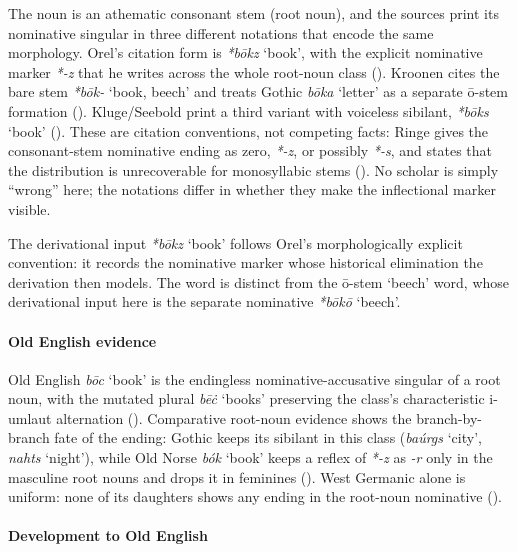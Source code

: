 \documentclass[
  british,
  a4paper,
]{article}
\newcounter{none} %
\providecommand{\Recon}[1]{\emph{*#1}}
\begin{document}
The noun is an athematic consonant stem (root noun), and the sources
print its nominative singular in three different notations that encode
the same morphology. Orel's citation form is \emph{*bōkz} `book', with
the explicit nominative marker \emph{*-z} that he writes across the
whole root-noun class (). Kroonen
cites the bare stem {\emph{*bōk-}} `book, beech' and treats Gothic
\emph{bōka} `letter' as a separate ō-stem formation
(). Kluge/Seebold print
a third variant with voiceless sibilant, {\emph{*bōks}} `book'
(). These are citation
conventions, not competing facts: Ringe gives the consonant-stem
nominative ending as zero, \emph{*-z}, or possibly \emph{*-s}, and
states that the distribution is unrecoverable for monosyllabic stems
(). No scholar is simply
``wrong'' here; the notations differ in whether they make the
inflectional marker visible.

The derivational input \Recon{bōkz} `book' follows Orel's
morphologically explicit convention: it records the nominative marker
whose historical elimination the derivation then models. The word is
distinct from the ō-stem `beech' word, whose derivational input here is
the separate nominative \Recon{bōkō} `beech'.

\paragraph{Old English evidence}\label{old-english-evidence-8}

Old English {\emph{bōc}} `book' is the endingless nominative-accusative
singular of a root noun, with the mutated plural \emph{bēċ} `books'
preserving the class's characteristic i-umlaut alternation
(). Comparative root-noun
evidence shows the branch-by-branch fate of the ending: Gothic keeps its
sibilant in this class (\emph{baúrgs} `city', \emph{nahts} `night'),
while Old Norse \emph{bók} `book' keeps a reflex of \emph{*-z} as
\emph{-r} only in the masculine root nouns and drops it in feminines
(). West Germanic alone is
uniform: none of its daughters shows any ending in the root-noun
nominative ().

\paragraph{Development to Old
English}\label{development-to-old-english-8}
\end{document}

